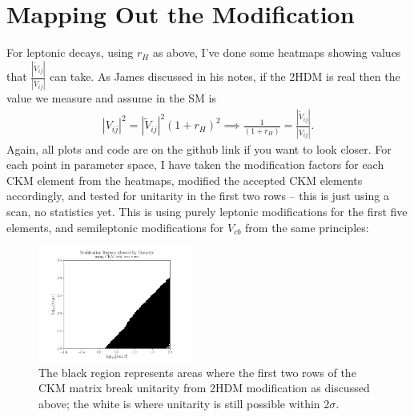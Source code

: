 \documentclass[11pt]{article}
\newcommand{\tVV}{\frac{|\tilde{V}_{ij}|}{|V_{ij}|}}
\begin{document}
\section{Mapping Out the Modification}
For leptonic decays, using $r_H$ as above, I've done some heatmaps showing values that $\tVV$ can take.
As James discussed in his notes, if the 2HDM is real then the value we measure and assume in the SM is
\begin{align*}
|V_{ij}|^2 = |\tilde{V}_{ij}|^2(1+r_H)^2 \implies \frac{1}{(1+r_H)} = \tVV.
\end{align*}
Again, all plots and code are on the github link if you want to look closer.
For each point in parameter space, I have taken the modification factors for each CKM element from the heatmaps, modified the accepted CKM elements accordingly, and tested for unitarity in the first two rows -- this is just using a scan, no statistics yet.
This is using purely leptonic modifications for the first five elements, and semileptonic modifications for $V_{cb}$ from the same principles:
\begin{figure}[H]
    \centering
    \includegraphics[width=0.45\textwidth]{heatmaps/mod.png}
    \caption{The black region represents areas where the first two rows of the CKM matrix break unitarity from 2HDM modification as discussed above; the white is where unitarity is still possible within $2\sigma$.}
\end{figure}
\end{document}
